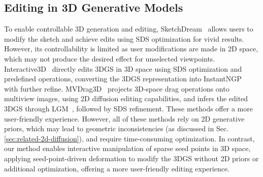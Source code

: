 \subsection{Editing in 3D Generative Models}  
\label{sec: relatd_edit}
To enable controllable 3D generation and editing, SketchDream~\cite{liu2024sketchdream} allows users to modify the sketch and achieve edits using SDS optimization for vivid results. However, its controllability is limited as user modifications are made in 2D space, which may not produce the desired effect for unselected viewpoints.  Interactive3D~\cite{dong2024interactive3d} directly edits 3DGS in 3D space using SDS optimization and predefined operations, converting the 3DGS representation into InstantNGP~\cite{muller2022instant} with further refine. MVDrag3D~\cite{chen2024mvdrag3d} projects 3D-space drag operations onto multiview images, using 2D diffusion editing capabilities, and infers the edited 3DGS through LGM~\cite{tang2025lgm}, followed by SDS refinement. These methods offer a more user-friendly experience. However, all of these methods rely on 2D generative priors, which may lead to geometric inconsistencies (as discussed in Sec. \ref{sec:related-2d-diffusion}), and require time-consuming optimization. In contrast, our method enables interactive manipulation of sparse seed points in 3D space, applying seed-point-driven deformation to modify the 3DGS without 2D priors or additional optimization, offering a more user-friendly editing experience.
